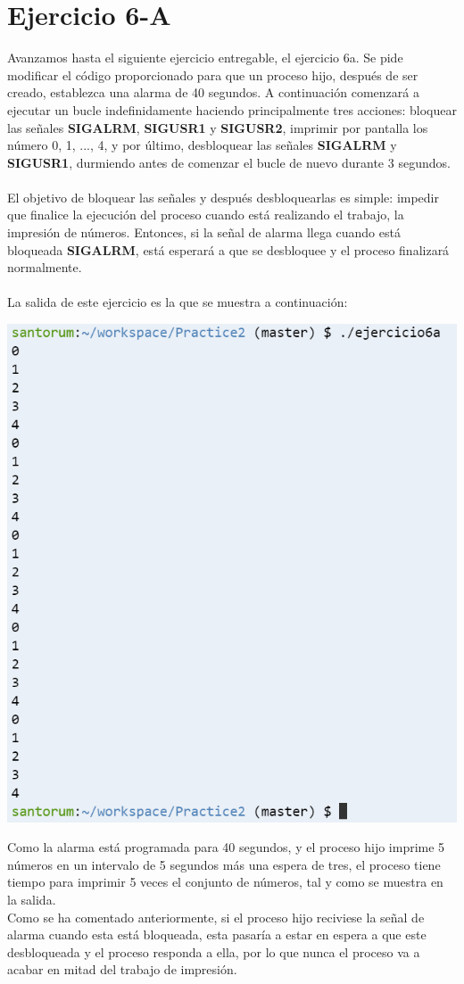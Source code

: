 \documentclass[12pt]{article}
\begin{document}
\section{Ejercicio 6-A}
Avanzamos hasta el siguiente ejercicio entregable, el ejercicio 6a. Se pide modificar el código proporcionado para que un proceso hijo, después de ser creado, establezca una alarma de 40 segundos. A continuación comenzará a ejecutar un bucle indefinidamente haciendo principalmente tres acciones: bloquear las señales \textbf{SIGALRM}, \textbf{SIGUSR1} y \textbf{SIGUSR2}, imprimir por pantalla los número 0, 1, ..., 4, y por último, desbloquear las señales \textbf{SIGALRM} y \textbf{SIGUSR1}, durmiendo antes de comenzar el bucle de nuevo durante 3 segundos.\\\\
El objetivo de bloquear las señales y después desbloquearlas es simple: impedir que finalice la ejecución del proceso cuando está realizando el trabajo, la impresión de números. Entonces, si la señal de alarma llega cuando está bloqueada \textbf{SIGALRM}, está esperará a que se desbloquee y el proceso finalizará normalmente.\\\\
La salida de este ejercicio es la que se muestra a continuación:
\begin{center}
	\includegraphics[scale=0.9]{ej6a.PNG}
\end{center}
Como la alarma está programada para 40 segundos, y el proceso hijo imprime 5 números en un intervalo de 5 segundos más una espera de tres, el proceso tiene tiempo para imprimir 5 veces el conjunto de números, tal y como se muestra en la salida.\\ Como se ha comentado anteriormente, si el proceso hijo reciviese la señal de alarma cuando esta está bloqueada, esta pasaría a estar en espera a que este desbloqueada y el proceso responda a ella, por lo que nunca el proceso va a acabar en mitad del trabajo de impresión.
\newpage
\end{document}
